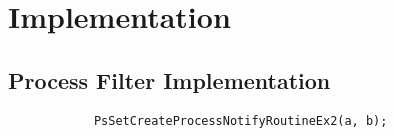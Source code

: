 \chapter{Implementation}
    \section{Process Filter Implementation}
        \begin{lstlisting}
            PsSetCreateProcessNotifyRoutineEx2(a, b);
        \end{lstlisting}
